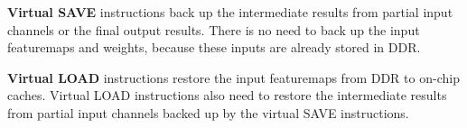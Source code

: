 \textbf{Virtual SAVE} instructions back up the intermediate results from partial input channels or the final output results. There is no need to back up the input featuremaps and weights, because these inputs are already stored in DDR. 

\textbf{Virtual LOAD} instructions restore the input featuremaps from DDR to on-chip caches.
Virtual LOAD instructions also need to restore the intermediate results from partial input channels backed up by the virtual SAVE instructions.









